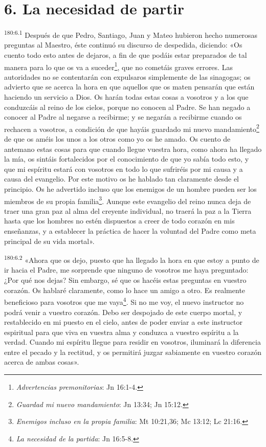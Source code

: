 \section*{6. La necesidad de partir}
\par 
\textsuperscript{180:6.1} Después de que Pedro, Santiago, Juan y Mateo hubieron hecho numerosas preguntas al Maestro, éste continuó su discurso de despedida, diciendo: «Os cuento todo esto antes de dejaros, a fin de que podáis estar preparados de tal manera para lo que os va a suceder\footnote{\textit{Advertencias premonitorias}: Jn 16:1-4.}, que no cometáis graves errores. Las autoridades no se contentarán con expulsaros simplemente de las sinagogas; os advierto que se acerca la hora en que aquellos que os maten pensarán que están haciendo un servicio a Dios. Os harán todas estas cosas a vosotros y a los que conduzcáis al reino de los cielos, porque no conocen al Padre. Se han negado a conocer al Padre al negarse a recibirme; y se negarán a recibirme cuando os rechacen a vosotros, a condición de que hayáis guardado mi nuevo mandamiento\footnote{\textit{Guardad mi nuevo mandamiento}: Jn 13:34; Jn 15:12.} de que os améis los unos a los otros como yo os he amado. Os cuento de antemano estas cosas para que cuando llegue vuestra hora, como ahora ha llegado la mía, os sintáis fortalecidos por el conocimiento de que yo sabía todo esto, y que mi espíritu estará con vosotros en todo lo que sufriréis por mi causa y a causa del evangelio. Por este motivo os he hablado tan claramente desde el principio. Os he advertido incluso que los enemigos de un hombre pueden ser los miembros de su propia familia\footnote{\textit{Enemigos incluso en la propia familia}: Mt 10:21,36; Mc 13:12; Lc 21:16.}. Aunque este evangelio del reino nunca deja de traer una gran paz al alma del creyente individual, no traerá la paz a la Tierra hasta que los hombres no estén dispuestos a creer de todo corazón en mis enseñanzas, y a establecer la práctica de hacer la voluntad del Padre como meta principal de su vida mortal».

\par 
\textsuperscript{180:6.2} «Ahora que os dejo, puesto que ha llegado la hora en que estoy a punto de ir hacia el Padre, me sorprende que ninguno de vosotros me haya preguntado: ¿Por qué nos dejas? Sin embargo, sé que os hacéis estas preguntas en vuestro corazón. Os hablaré claramente, como lo hace un amigo a otro. Es realmente beneficioso para vosotros que me vaya\footnote{\textit{La necesidad de la partida}: Jn 16:5-8.}. Si no me voy, el nuevo instructor no podrá venir a vuestro corazón. Debo ser despojado de este cuerpo mortal, y restablecido en mi puesto en el cielo, antes de poder enviar a este instructor espiritual para que viva en vuestra alma y conduzca a vuestro espíritu a la verdad. Cuando mi espíritu llegue para residir en vosotros, iluminará la diferencia entre el pecado y la rectitud, y os permitirá juzgar sabiamente en vuestro corazón acerca de ambas cosas».

